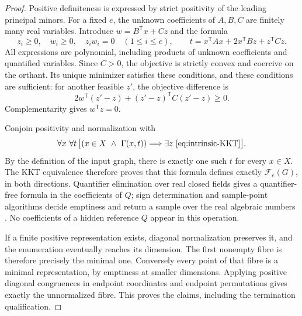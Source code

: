 \begin{proof}
Positive definiteness is expressed by strict positivity of the leading principal minors. For a fixed $e$, the unknown coefficients of $A,B,C$ are finitely many real variables. Introduce $w=B^{\mathsf T}x+Cz$ and the formula
\begin{equation}\label{eq:intrinsic-KKT}
 z_i\ge0,\quad w_i\ge0,\quad z_iw_i=0\quad(1\le i\le e),\qquad
 t=x^{\mathsf T}Ax+2x^{\mathsf T}Bz+z^{\mathsf T}Cz.
\end{equation}
All expressions are polynomial, including products of unknown coefficients and quantified variables. Since $C>0$, the objective is strictly convex and coercive on the orthant. Its unique minimizer satisfies these conditions, and these conditions are sufficient: for another feasible $z'$, the objective difference is
\[
 2w^{\mathsf T}(z'-z)+(z'-z)^{\mathsf T}C(z'-z)\ge0.
\]
Complementarity gives $w^{\mathsf T}z=0$.

Conjoin positivity and normalization with
\begin{equation}\label{eq:function-input-formula}
 \forall x\ \forall t\,
 \big[(x\in X\ \wedge\ \Gamma(x,t))
       \Longrightarrow\exists z\ \text{\eqref{eq:intrinsic-KKT}}\big].
\end{equation}
By the definition of the input graph, there is exactly one such $t$ for every $x\in X$. The KKT equivalence therefore proves that this formula defines exactly $\mathcal F_e(G)$, in both directions. Quantifier elimination over real closed fields gives a quantifier-free formula in the coefficients of $Q$; sign determination and sample-point algorithms decide emptiness and return a sample over the real algebraic numbers \cite{BCR}. No coefficients of a hidden reference $Q$ appear in this operation.

If a finite positive representation exists, diagonal normalization preserves it, and the enumeration eventually reaches its dimension. The first nonempty fibre is therefore precisely the minimal one. Conversely every point of that fibre is a minimal representation, by emptiness at smaller dimensions. Applying positive diagonal congruences in endpoint coordinates and endpoint permutations gives exactly the unnormalized fibre. This proves the claims, including the termination qualification.
\end{proof}

